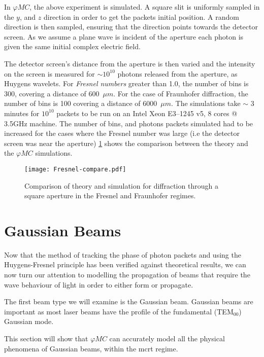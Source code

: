 \medskip

In $\varphi MC$, the above experiment is simulated. 
A square slit is uniformly sampled in the $y$, and $z$ direction in order to get the packets initial position. 
A random direction is then sampled, ensuring that the direction points towards the detector screen.
As we assume a plane wave is incident of the aperture each photon is given the same initial complex electric field.

The detector screen's distance from the aperture is then varied and the intensity on the screen is measured for $\sim 10^{10}$ photons released from the aperture, as Huygens wavelets.
For \textit{Fresnel numbers} greater than 1.0, the number of bins is 300, covering a distance of 600~$\mu m$. 
For the case of Fraunhofer diffraction, the number of bins is 100 covering a distance of 6000~$\mu m$.
The simulations take $\sim$ 3 minutes for $10^{10}$ packets to be run on an Intel Xeon E3--1245 v5, 8 cores @ 3.5GHz machine.
The number of bins, and photons packets simulated had to be increased for the cases where the Fresnel number was large (i.e the detector screen was near the aperture)
\cref{fig:frescompare} shows the comparison between the theory and the $\varphi MC$ simulations.

\begin{figure}[!ht]
    \centering
    \texttt{[image: Fresnel-compare.pdf]}
    \caption{Comparison of theory and simulation for diffraction through a square aperture in the Fresnel and Fraunhofer regimes.}
    \label{fig:frescompare}
\end{figure}

\FloatBarrier

\section{Gaussian Beams}

Now that the method of tracking the phase of photon packets and using the Huygens-Fresnel principle has been verified against theoretical results, we can now turn our attention to modelling the propagation of beams that require the wave behaviour of light in order to either form or propagate.

The first beam type we will examine is the Gaussian beam.
Gaussian beams are important as most laser beams have the profile of the fundamental (TEM$_{00}$) Gaussian mode.

This section will show that $\varphi MC$ can accurately model all the physical phenomena of Gaussian beams, within the \gls*{mcrt} regime.

